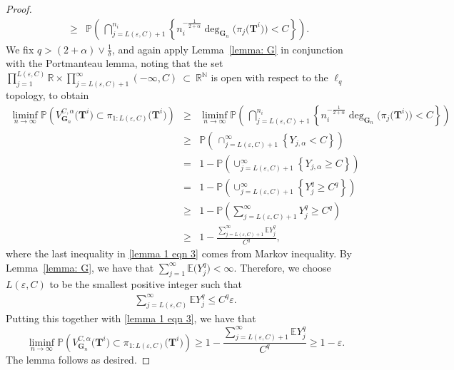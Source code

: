 \documentclass[twoside,11pt]{article}
\theoremstyle{remark}
\begin{document}
\begin{proof}
\begin{eqnarray*}
    &\ge & \mathbb{P}\left(\, \bigcap^{n_i}_{j=L\left(\varepsilon, C\right)+1}\left\{n_i^{-\frac{1}{2+\alpha}}\operatorname{deg}_{\boldsymbol{G}_n}\bigl(\pi_{j}\bigl(\boldsymbol{T}^i\bigr)\bigr)< C \right\}\right).
\end{eqnarray*}
%
We fix $q > \left(2+\alpha\right) \vee \frac{1}{\delta}$, and again apply Lemma~\ref{lemma: G} in conjunction with the Portmanteau lemma, noting that the set $\prod_{j=1}^{L(\varepsilon,C)} \mathbb{R} 
   \times \prod_{j=L(\varepsilon,C)+1}^{\infty} (-\infty,C)
\ \subset \ \mathbb{R}^{\mathbb{N}}$ is open with respect to the $\ell_q$ topology, to obtain
%
\begin{eqnarray}
\label{lemma 1 eqn 3}
\nonumber
    \liminf_{n \rightarrow \infty} \mathbb{P}\left( V^{C,\alpha}_{\boldsymbol{G}_n}\bigl(\boldsymbol{T}^i\bigr)\subset\pi_{1:{L\left(\varepsilon, C\right)}}\bigl(\boldsymbol{T}^i\bigr)\right)&\ge &\liminf_{n \rightarrow \infty} \mathbb{P}\left(\,\bigcap^{n_i}_{j=L\left(\varepsilon, C\right)+1}\left\{n_i^{-\frac{1}{2+\alpha}}\operatorname{deg}_{\boldsymbol{G}_n}\bigl(\pi_{j}\bigl(\boldsymbol{T}^i\bigr)\bigr)< C \right\}\right)\\
    \nonumber
    &\geq& \mathbb{P}\left(\, \cap^\infty_{j=L\left(\varepsilon, C\right)+1}\left\{Y_{j, \alpha}< C \right\}\right)\\
    \nonumber
    &=& 1- \mathbb{P}\left( \cup^\infty_{j=L\left(\varepsilon, C\right)+1}\left\{Y_{j, \alpha}\geq  C \right\}\right)\\
    \nonumber
    &=& 1- \mathbb{P}\left(\cup^\infty_{j=L\left(\varepsilon, C\right)+1}\left\{Y^q_j\geq  C^q \right\}\right)\\
    \nonumber
    &\ge& 1-\mathbb{P}\left(\sum_{j=L\left(\varepsilon, C\right)+1}^\infty Y^q_j\geq  C^q \right)\\
    &\ge &1- \frac{\sum_{j=L\left(\varepsilon, C\right)+1}^\infty \mathbb{E} Y^q_j}{C^q},
\end{eqnarray}
%
where the last inequality in \eqref{lemma 1 eqn 3} comes from Markov inequality.
By Lemma~\ref{lemma: G}, we have that $\sum_{j=1}^\infty \mathbb{E}\bigl(Y^q_j\bigr)<\infty$. Therefore, we choose $L\left(\varepsilon,C\right)$ to be the smallest positive integer such that 
%
\begin{align}
\sum_{j=L(\varepsilon, C)}^\infty \mathbb{E} Y^q_j \le C^q \varepsilon. \label{eq:L_defn}
\end{align}
%
Putting this together with \eqref{lemma 1 eqn 3}, we have that
%
\begin{equation*}
     \liminf_{n \rightarrow \infty} \mathbb{P}\left( V^{C,\alpha}_{\boldsymbol{G}_n}\bigl(\boldsymbol{T}^i\bigr)\subset\pi_{1:{L\left(\varepsilon, C\right)}}\bigl(\boldsymbol{T}^i\bigr)\right)\geq 1- \frac{\sum_{j=L\left(\varepsilon, C\right)+1}^\infty \mathbb{E} Y^q_j}{C^q}\geq 1-\varepsilon.
\end{equation*}
%
The lemma follows as desired.
\end{proof}
\end{document}
